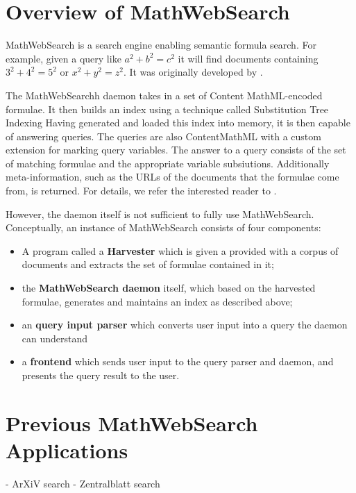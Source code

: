 \documentclass[a4paper,twoside,12pt]{article}
\begin{document}
\section{Overview of MathWebSearch}

MathWebSearch  is a search engine enabling semantic formula search. 
For example, given a query like $a^2 + b^2 = c^2$ it will find documents containing $3^2 + 4^2 = 5^2$ or $x^2 + y^2 = z^2$.
It was originally developed by . 

The MathWebSearchh daemon takes in a set of Content MathML-encoded formulae.
It then builds an index using a technique called Substitution Tree Indexing
Having generated and loaded this index into memory, it is then capable of answering queries.
The queries are also ContentMathML with a custom extension for marking query variables.
The answer to a query consists of the set of matching formulae and the appropriate variable subsiutions. 
Additionally meta-information, such as the URLs of the documents that the formulae come from, is returned. 
For details, we refer the interested reader to .  

However, the daemon itself is not sufficient to fully use MathWebSearch. 
Conceptually, an instance of MathWebSearch consists of four components:
\begin{itemize}
    \item A program called a \textbf{Harvester} which is given a provided with a corpus of documents and extracts the set of formulae contained in it;
    \item the \textbf{MathWebSearch daemon} itself, which based on the harvested formulae, generates and maintains an index as described above;
    \item an \textbf{query input parser} which converts user input into a query the daemon can understand
    \item a \textbf{frontend} which sends user input to the query parser and daemon, and presents the query result to the user.  
\end{itemize}

\section{Previous MathWebSearch Applications}

- ArXiV search
- Zentralblatt search
\end{document}
